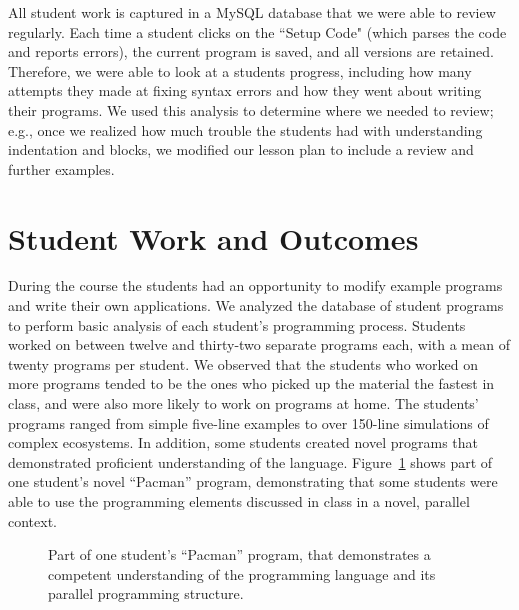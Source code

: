 \documentclass{sig-alternate}
\newcommand{\INDSTATE}[1][1]{\STATE\hspace{#1\algorithmicindent}}
\begin{document}
All student work is captured in a MySQL database that we were able to review regularly.  Each time
a student clicks on the ``Setup Code" (which parses the code and reports errors), the current
program is saved, and all versions are retained.  Therefore, we were able to look at a students 
progress, including how many attempts they made at fixing syntax errors and how they went about
writing their programs.  We used this analysis to determine where we needed to review; e.g.,
once we realized how much trouble the students had with understanding indentation and blocks, we
modified our lesson plan to include a review and further examples.

\section{Student Work and Outcomes}
During the course the students had an opportunity to modify example programs and write their own applications.  
We analyzed the database of student programs to perform basic analysis of each student's programming process.
Students worked on between twelve and thirty-two separate programs each, with a mean of twenty programs per student.  
We observed that the students who worked on more programs tended to be the ones who picked up
the material the fastest in class, and were also more likely to work on programs at home.  
The students' programs ranged from simple five-line examples to over 150-line simulations of complex ecosystems.
In addition, some students created novel programs that demonstrated proficient understanding of the language.  
Figure~\ref{fig:pacmanProgram} shows part of one student's novel ``Pacman'' program, 
demonstrating that some students were able to use the programming elements discussed in class
in a novel, parallel context.


\begin{figure}
\begin{algorithmic}[1]\sf
\setcounter{ALC@line}{22}
  \INDSTATE{for each pacman}
    \INDSTATE[2]{do in any order}
      \INDSTATE[3]{move the pacman's position a random number between 10 and 50 right}
      \INDSTATE[3]{move the pacman's position a random number between 10 and 50 left}
      \INDSTATE[3]{move the pacman's position a random number between 10 and 50 up}
      \INDSTATE[3]{move the pacman's position a random number between 10 and 50 down}
\STATE
{}
  \INDSTATE{destroy the pacman}
\end{algorithmic} 
\caption{Part of one student's ``Pacman'' program, that demonstrates a competent understanding
of the programming language and its parallel programming structure.}
\label{fig:pacmanProgram} 
\end{figure}
\end{document}
